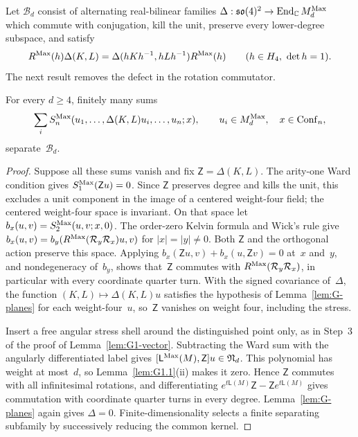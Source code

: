 Let $\mathcal B_d$ consist of alternating real-bilinear families $\Delta:\mathfrak{so}(4)^2\to\operatorname{End}_{\mathbb{C}}M_{d}^{\mathrm{Max}}$ which commute with conjugation, kill the unit, preserve every lower-degree subspace, and satisfy
\begin{equation*}
R^{\rm Max}(h)\Delta(K,L)=\Delta(hKh^{-1},hLh^{-1})R^{\rm Max}(h)
\qquad(h\in H_4,\ \det h=1).
\end{equation*}
The next result removes the defect in the rotation commutator.
\begin{lemma}\label{lem:G1-internal}
For every $d\ge4$, finitely many sums
\begin{equation}\label{eq:G-erasure-test}
\sum_i S_n^{\rm Max}(u_1,\ldots,\Delta(K,L)u_i,\ldots,u_n;x),
\qquad u_i\in M_{d}^{\mathrm{Max}},\quad x\in\mathrm{Conf}_{n},
\end{equation}
separate~$\mathcal B_d$.
\end{lemma}
\begin{proof}
Suppose all these sums vanish and fix $\mathsf Z=\Delta(K,L)$. The arity-one Ward condition gives $S_1^{\rm Max}(\mathsf Zu)=0$. Since $\mathsf Z$ preserves degree and kills the unit, this excludes a unit component in the image of a centered weight-four field; the centered weight-four space is invariant. On that space let $b_x(u,v)=S_2^{\rm Max}(u,v;x,0)$. The order-zero Kelvin formula and Wick's rule give $b_x(u,v)=b_y(R^{\rm Max}(\mathcal R_y\mathcal R_x)u,v)$ for $|x|=|y|\ne0$. Both $\mathsf Z$ and the orthogonal action preserve this space. Applying $b_x(\mathsf Zu,v)+b_x(u,\mathsf Zv)=0$ at~$x$ and~$y$, and nondegeneracy of~$b_y$, shows that~$\mathsf Z$ commutes with $R^{\rm Max}(\mathcal R_y\mathcal R_x)$, in particular with every coordinate quarter turn. With the signed covariance of~$\Delta$, the function $(K,L)\mapsto\Delta(K,L)u$ satisfies the hypothesis of Lemma~\ref{lem:G-planes} for each weight-four~$u$, so~$\mathsf Z$ vanishes on weight four, including the stress.

Insert a free angular stress shell around the distinguished point only, as in Step~3 of the proof of Lemma~\ref{lem:G1-vector}. Subtracting the Ward sum with the angularly differentiated label gives $[\mathsf L^{\rm Max}(M),\mathsf Z]u\in\mathfrak N_d$. This polynomial has weight at most~$d$, so Lemma~\ref{lem:G1.1}(ii) makes it zero. Hence $\mathsf Z$ commutes with all infinitesimal rotations, and differentiating $e^{t\mathsf L(M)}\mathsf Z-\mathsf Ze^{t\mathsf L(M)}$ gives commutation with coordinate quarter turns in every degree. Lemma~\ref{lem:G-planes} again gives $\Delta=0$. Finite-dimensionality selects a finite separating subfamily by successively reducing the common kernel.
\end{proof}

